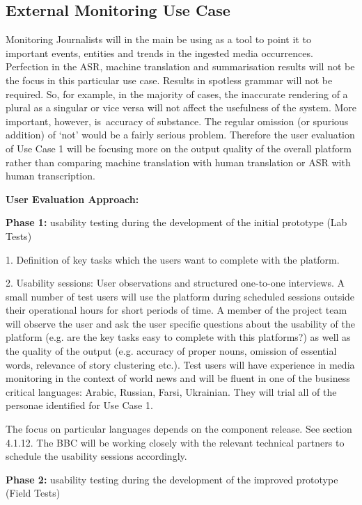 \subsection{External Monitoring Use Case}
Monitoring Journalists will in the main be using \SUMMA as a tool to point it to important events, entities and trends in the ingested media occurrences. Perfection in the ASR, machine translation and summarisation results will not be the focus in this particular use case. Results in spotless grammar will not be required. So, for example, in the majority of cases, the inaccurate rendering of a plural as a singular or vice versa will not affect the usefulness of the system. 
More important, however, is accuracy of substance. The regular omission (or spurious addition) of ‘not’ would be a fairly serious problem. Therefore the user evaluation of Use Case 1 will be focusing more on the output quality of the overall platform rather than comparing machine translation with human translation or ASR with human transcription.
\medskip

\textbf{User Evaluation Approach:} 

\textbf{Phase 1:} usability testing during the development of the initial prototype (Lab Tests)

1. Definition of key tasks which the users want to complete with the \SUMMA platform. 

2. Usability sessions: User observations and structured one-to-one interviews. A small number of test users will use the platform during scheduled sessions outside their operational hours for short periods of time. A member of the project team will observe the user and ask the user specific questions about the usability of the platform (e.g. are the key tasks easy to complete with this platforms?) as well as the quality of the output (e.g. accuracy of proper nouns, omission of essential words, relevance of story clustering etc.). Test users will have experience in media monitoring in the context of world news and will be fluent in one of the business critical languages: Arabic, Russian, Farsi, Ukrainian. They will trial all of the personae identified for Use Case 1. 
\medskip

The focus on particular languages depends on the component release. See section 4.1.12. The BBC will be working closely with the relevant technical partners to schedule the usability sessions accordingly.
\medskip

\textbf{Phase 2:} usability testing during the development of the improved prototype (Field Tests)
\smallskip

